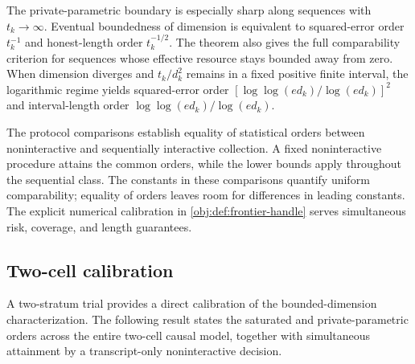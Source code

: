 \documentclass[11pt]{article}
\begin{document}
The private-parametric boundary is especially sharp along sequences with \(t_k\to\infty\). Eventual boundedness of dimension is equivalent to squared-error order \(t_k^{-1}\) and honest-length order \(t_k^{-1/2}\). The theorem also gives the full comparability criterion for sequences whose effective resource stays bounded away from zero. When dimension diverges and \(t_k/d_k^2\) remains in a fixed positive finite interval, the logarithmic regime yields squared-error order \([\log\log(ed_k)/\log(ed_k)]^2\) and interval-length order \(\log\log(ed_k)/\log(ed_k)\).

The protocol comparisons establish equality of statistical orders between noninteractive and sequentially interactive collection. A fixed noninteractive procedure attains the common orders, while the lower bounds apply throughout the sequential class. The constants in these comparisons quantify uniform comparability; equality of orders leaves room for differences in leading constants. The explicit numerical calibration in \cref{obj:def:frontier-handle} serves simultaneous risk, coverage, and length guarantees.

\subsection{Two-cell calibration}

A two-stratum trial provides a direct calibration of the bounded-dimension characterization. The following result states the saturated and private-parametric orders across the entire two-cell causal model, together with simultaneous attainment by a transcript-only noninteractive decision.
\end{document}
